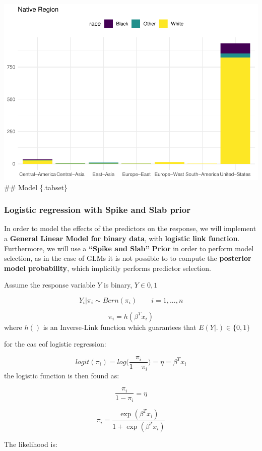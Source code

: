 \documentclass[
]{article}
\begin{document}
\includegraphics{bmp_main_files/figure-latex/native plot-1.pdf} \#\#
Model \{.tabset\}

\hypertarget{logistic-regression-with-spike-and-slab-prior}{%
\subsubsection{Logistic regression with Spike and Slab
prior}\label{logistic-regression-with-spike-and-slab-prior}}

In order to model the effects of the predictors on the response, we will
implement a \textbf{General Linear Model for binary data}, with
\textbf{logistic link function}. Furthermore, we will use a
\textbf{``Spike and Slab'' Prior} in order to perform model selection,
as in the case of GLMs it is not possible to to compute the
\textbf{posterior model probability}, which implicitly performs
predictor selection.

Assume the response variable \(Y\) is binary, \(Y \in {0,1}\)

\[Y_i | \pi_i \sim Bern(\pi_i) \qquad i=1,...,n\]

\[\pi_i = h(\beta^T x_i)\] where \(h()\) is an Inverse-Link function
which guarantees that \(E(Y|.) \in \{0,1\}\)

for the cas eof logistic regression:

\[logit(\pi_i) = log \bigg( \frac{\pi_i}{1 - \pi_i} \bigg) = \eta = \beta^Tx_i\]
the logistic function is then found as:

\[\frac{\pi_i}{1 - \pi_i} = \eta\]

\[\pi_i = \frac{\exp(\beta^Tx_i)}{1 + \exp(\beta^Tx_i)}\]

The likelihood is:
\end{document}
